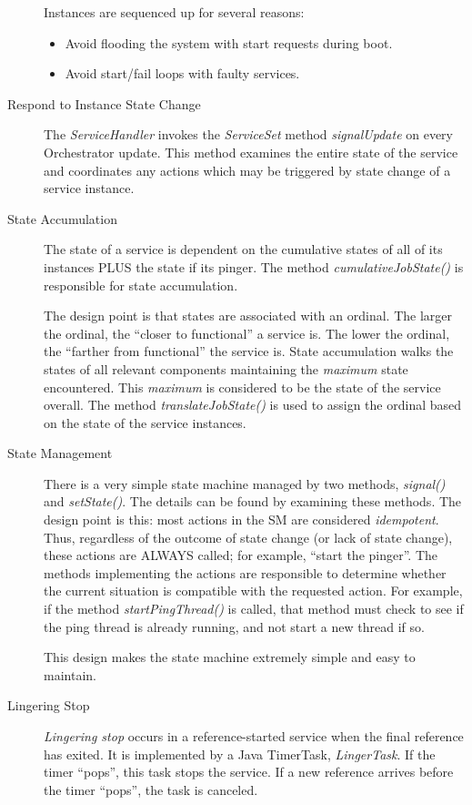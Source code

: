 \begin{description}
      Instances are sequenced up for several reasons:
      \begin{itemize}
        \item Avoid flooding the system with start requests during boot.
        \item Avoid start/fail loops with faulty services.
      \end{itemize}
      
    \item[Respond to Instance State Change]  The {\em ServiceHandler} invokes the {\em ServiceSet}
      method {\em signalUpdate} on every Orchestrator update.  This method examines the entire
      state of the service and coordinates any actions which may be triggered by state change
      of a service instance.

    \item[State Accumulation]  The state of a service is dependent on the cumulative states of
      all of its instances PLUS the state if its pinger.  The method {\em cumulativeJobState()}
      is responsible for state accumulation.

      The design point is that states are associated with an ordinal.  The larger the ordinal,
      the ``closer to functional'' a service is.  The lower the ordinal, the ``farther from functional''
      the service is.  State accumulation walks the states of all relevant components maintaining
      the {\em maximum} state encountered.  This {\em maximum} is considered to be the state of the
      service overall.  The method {\em translateJobState()} is used to assign the ordinal
      based on the state of the service instances.

    \item[State Management] There is a very simple state machine managed by two methods,
      {\em signal()} and {\em setState()}.  The details can be found by examining these methods.
      The design point is this:  most actions in the SM are considered {\em idempotent}.  Thus,
      regardless of the outcome of state change (or lack of state change), these actions are
      ALWAYS called; for example, ``start the pinger''.  The methods implementing the actions
      are responsible to determine whether the current situation is compatible with the requested
      action.  For example, if the method {\em startPingThread()} is called, that method must
      check to see if the ping thread is already running, and not start a new thread if so.

      This design makes the state machine extremely simple and easy to maintain.

      \item[Lingering Stop] {\em Lingering stop} occurs in a reference-started service when the
        final reference has exited.  It is implemented by a Java TimerTask, {\em LingerTask}.
        If the timer ``pops'', this task stops the service.  If a new reference arrives
        before the timer ``pops'', the task is canceled.

   \end{description}

